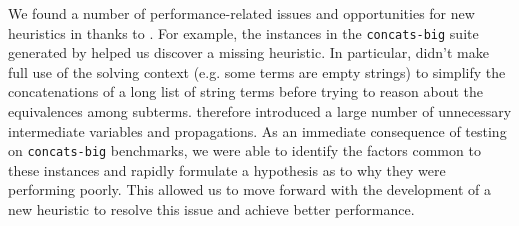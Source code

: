 We found a number of performance-related issues and opportunities for
new heuristics in \us{} thanks to \fuzzer{}. For example, the
instances in the \texttt{concats-big} suite generated by \fuzzer{}
helped us discover a missing heuristic. In particular, \us{} didn't
make full use of the solving context (e.g. some terms are empty
strings) to simplify the concatenations of a long list of string terms
before trying to reason about the equivalences among subterms. \us{}
therefore introduced a large number of unnecessary intermediate
variables and propagations. As an immediate consequence of
testing \us{} on \texttt{concats-big} benchmarks, we were able to
identify the factors common to these instances and rapidly formulate a
hypothesis as to why they were performing poorly. This allowed us to
move forward with the development of a new heuristic to resolve this
issue and achieve better performance.


